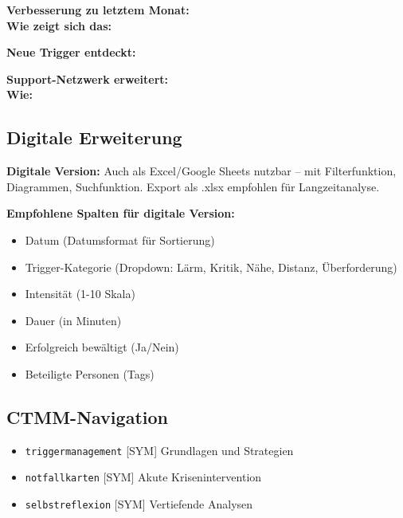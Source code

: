 \textbf{Verbesserung zu letztem Monat:}\\
 \quad \textbf{Wie zeigt sich das:} 

\textbf{Neue Trigger entdeckt:}\\

\textbf{Support-Netzwerk erweitert:}\\
 \quad \textbf{Wie:} 

\subsection*{\textcolor{ctmmBlue}{Digitale Erweiterung}}

\begin{ctmmBlueBox}[title=Tipp für digitale Nutzung]
\textbf{Digitale Version:} Auch als Excel/Google Sheets nutzbar -- mit Filterfunktion, Diagrammen, Suchfunktion. Export als .xlsx empfohlen für Langzeitanalyse.

\textbf{Empfohlene Spalten für digitale Version:}
\begin{itemize}
  \item Datum (Datumsformat für Sortierung)
  \item Trigger-Kategorie (Dropdown: Lärm, Kritik, Nähe, Distanz, Überforderung)
  \item Intensität (1-10 Skala)
  \item Dauer (in Minuten)
  \item Erfolgreich bewältigt (Ja/Nein)
  \item Beteiligte Personen (Tags)
\end{itemize}
\end{ctmmBlueBox}

\subsection*{\textcolor{ctmmBlue}{CTMM-Navigation}}
\begin{itemize}
  \item \texttt{triggermanagement} [SYM] Grundlagen und Strategien
  \item \texttt{notfallkarten} [SYM] Akute Krisenintervention
  \item \texttt{selbstreflexion} [SYM] Vertiefende Analysen
\end{itemize}
